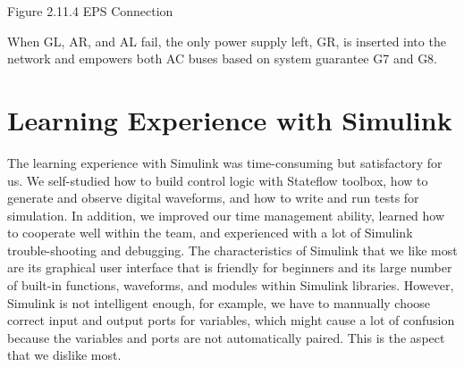 \documentclass{mcmthesis}
\begin{document}
\begin{center}
\small{Figure 2.11.4 EPS Connection}
\end{center}
When GL, AR,  and AL fail,  the only power supply left, GR, is inserted into the network and empowers both AC buses based on system guarantee G7 and G8.
\pagebreak

\section{Learning Experience with Simulink}
The learning experience with Simulink was time-consuming but satisfactory for us. We self-studied how to build control logic with Stateflow toolbox, how to generate and observe digital waveforms, and how to write and run tests for simulation. In addition, we improved our time management ability, learned how to cooperate well within the team, and experienced with a lot of Simulink trouble-shooting and debugging. The characteristics of Simulink that we like most are its graphical user interface that is friendly for beginners and its large number of built-in functions, waveforms, and modules within Simulink libraries. However, Simulink is not intelligent enough, for example, we have to mannually choose correct input and output ports for variables, which might cause a lot of confusion because the variables and ports are not automatically paired. This is the aspect that we dislike most.
\end{document}
